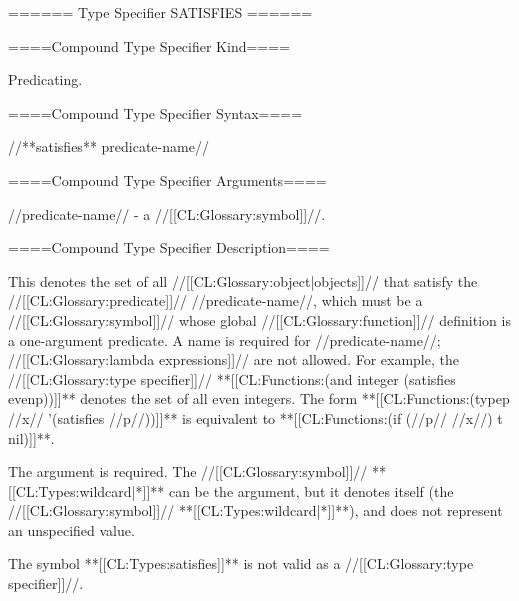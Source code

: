 ====== Type Specifier SATISFIES ======

====Compound Type Specifier Kind====

Predicating.

====Compound Type Specifier Syntax====

//**satisfies** predicate-name//

====Compound Type Specifier Arguments====

//predicate-name// - a //[[CL:Glossary:symbol]]//.

====Compound Type Specifier Description====


This denotes the set of all //[[CL:Glossary:object|objects]]// that satisfy the //[[CL:Glossary:predicate]]// //predicate-name//, which must be a //[[CL:Glossary:symbol]]// whose global //[[CL:Glossary:function]]// definition is a one-argument predicate. A name is required for //predicate-name//; //[[CL:Glossary:lambda expressions]]// are not allowed. For example, the //[[CL:Glossary:type specifier]]// **[[CL:Functions:(and integer (satisfies evenp))]]** denotes the set of all even integers. The form **[[CL:Functions:(typep //x// '(satisfies //p//))]]** is equivalent to **[[CL:Functions:(if (//p// //x//) t nil)]]**.

The argument is required. The //[[CL:Glossary:symbol]]// **[[CL:Types:wildcard|*]]** can be the argument, but it denotes itself (the //[[CL:Glossary:symbol]]// **[[CL:Types:wildcard|*]]**), and does not represent an unspecified value.

The symbol **[[CL:Types:satisfies]]** is not valid as a //[[CL:Glossary:type specifier]]//.

